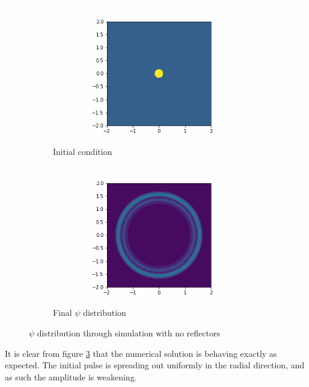 \documentclass{article}
\begin{document}
\begin{figure}[h]
  \begin{subfigure}[b]{0.45\textwidth}
    \includegraphics[width=\textwidth]{figures/no-reflector-0}
    \caption{Initial condition}
    \label{fig:no-ref-init}
  \end{subfigure}
  \begin{subfigure}[b]{0.45\textwidth}
    \includegraphics[width=\textwidth]{figures/no-reflector-160}
    \caption{Final $\psi$ distribution}
    \label{fig:no-ref-final}
  \end{subfigure}
  \caption{$\psi$ distribution through simulation with no reflectors}
  \label{fig:no-reflector}
\end{figure}

It is clear from figure \ref{fig:no-reflector} that the numerical solution
is behaving exactly as expected.  The initial pulse is spreading out uniformly
in the radial direction, and as such the amplitude is weakening.
\end{document}
